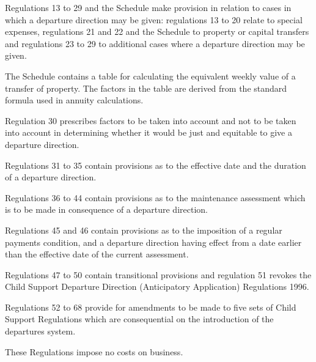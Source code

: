 \documentclass[12pt,a4paper]{article}
\begin{document}
Regulations 13 to 29 and the Schedule make provision in relation to cases in
which a departure direction may be given: regulations 13 to 20 relate to special
expenses, regulations 21 and 22 and the Schedule to property or capital
transfers and regulations 23 to 29 to additional cases where a departure
direction may be given.

The Schedule contains a table for calculating the equivalent weekly value of a
transfer of property. The factors in the table are derived from the standard
formula used in annuity calculations.

Regulation 30 prescribes factors to be taken into account and not to be taken
into account in determining whether it would be just and equitable to give a
departure direction.

Regulations 31 to 35 contain provisions as to the effective date and the
duration of a departure direction.

Regulations 36 to 44 contain provisions as to the maintenance assessment which
is to be made in consequence of a departure direction.

Regulations 45 and 46 contain provisions as to the imposition of a regular
payments condition, and a departure direction having effect from a date earlier
than the effective date of the current assessment.

Regulations 47 to 50 contain transitional provisions and regulation 51 revokes
the Child Support Departure Direction (Anticipatory Application) Regulations
1996.

Regulations 52 to 68 provide for amendments to be made to five sets of Child
Support Regulations which are consequential on the introduction of the
departures system.

  These Regulations impose no costs on business.
\end{document}
